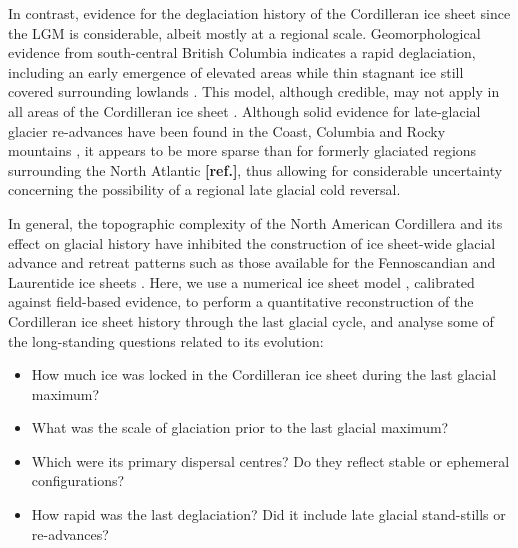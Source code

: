 \documentclass[tc, manuscript]{copernicus}
\newcommand{\aref}[0]{\textbf{[ref.]}}
\begin{document}
In contrast, evidence for the deglaciation history of the Cordilleran
ice sheet since the LGM is considerable, albeit mostly at a regional scale.
Geomorphological evidence from south-central British Columbia indicates a rapid
deglaciation, including an early emergence of elevated areas while thin
stagnant ice still covered surrounding lowlands
    \citep{Fulton.1967, Fulton.1991, Margold.etal.2011, Margold.etal.2013a}.
This model, although credible, may not apply in all areas of the Cordilleran
ice sheet
    \citep{Margold.etal.2013}.
Although solid evidence for late-glacial glacier re-advances have been found in
the Coast, Columbia and Rocky mountains
    \citep{Clague.etal.1997, Friele.Clague.2002, Friele.Clague.2002a,
           Kovanen.2002, Kovanen.Easterbrook.2002, Lakeman.etal.2008,
           Menounos.etal.2008},
it appears to be more sparse than for formerly glaciated regions surrounding
the North Atlantic \aref, thus allowing for considerable uncertainty concerning
the possibility of a regional late glacial cold reversal.

In general, the topographic complexity of the North American Cordillera and its
effect on glacial history have inhibited the construction of ice sheet-wide
glacial advance and retreat patterns such as
those available for the Fennoscandian and Laurentide ice sheets
     \citep{Boulton.etal.2001, Dyke.Prest.1987, Dyke.etal.2003,
            Kleman.etal.1997, Kleman.etal.2010}.
Here, we use a numerical ice sheet model \citep{PISM-authors.2014},
calibrated against field-based evidence, to perform a quantitative
reconstruction of the Cordilleran ice sheet history through the last glacial
cycle, and
analyse some of the long-standing questions related to its evolution:

\begin{itemize}
  \item How much ice was locked in the Cordilleran ice sheet during the
    last glacial maximum?
  \item What was the scale of glaciation prior to the last glacial maximum?
  \item Which were its primary dispersal centres? Do they reflect stable or
    ephemeral configurations?
  \item How rapid was the last deglaciation? Did it include late glacial
    stand-stills or re-advances?
\end{itemize}
\end{document}
